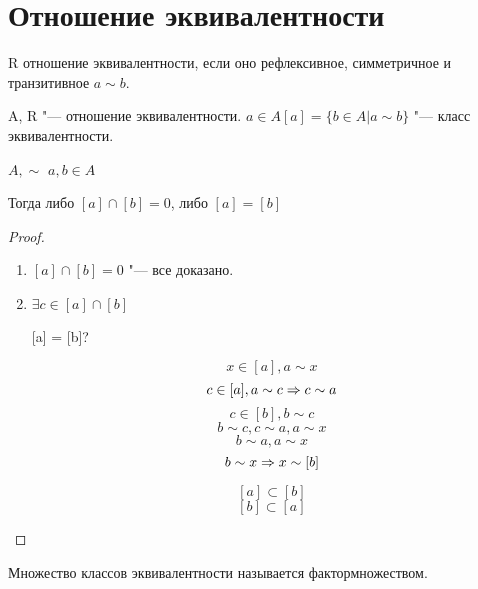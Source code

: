 ﻿\section{Отношение эквивалентности}

\begin{Def}
    R отношение эквивалентности, если оно рефлексивное, симметричное и транзитивное $a \sim b$.
    
    A, R "--- отношение эквивалентности.
    $a \in A [a] = \{b \in A| a \sim b\}$ "--- класс эквивалентности.  
\end{Def}

\begin{theorem}{}
$A,\sim$
$a, b \in A$

Тогда либо $[a]\cap [b] = 0$, либо $[a] = [b]$ 
\end{theorem}

\begin{proof}
\begin{enumerate}
\item $[a] \cap [b] = 0$ "--- все доказано.
\item $\exists c \in [a] \cap [b]$

[a] = [b]?

$$x \in [a], a \sim x$$
$$c \in [a], a \sim c \Rightarrow c \sim a$$
$$c \in [b], b \sim c$$
$$b \sim c, c \sim a, a \sim x$$
$$b \sim a, a \sim x$$
$$b \sim x \Rightarrow x \sim [b]$$

$$[a] \subset [b]$$
$$[b] \subset [a]$$
\end{enumerate}
\end{proof}

Множество классов эквивалентности называется фактормножеством.
